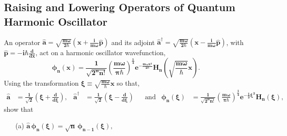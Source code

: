 \documentclass{article}
\begin{document}
{	\subsection*{Raising and Lowering Operators of Quantum Harmonic Oscillator}
	An operator $\bm{\hat{a} = \sqrt{\frac{m\omega}{2\hbar}} \left( x + \frac{i}{m\omega} \hat{p} \right)}$ and its adjoint $\bm{\hat{a}^{\dagger} = \sqrt{\frac{m\omega}{2\hbar}} \left( x - \frac{i}{m\omega} \hat{p} \right)}$, with $\bm{\hat{p} = -i\hbar \frac{d}{dx}}$, act on a harmonic oscillator wavefunction,
	\[
		\bm{\phi_n(x) = \frac{1}{\sqrt{2^n n!}}\left( \frac{m\omega}{\pi \hbar} \right)^{\frac{1}{4}} e^{-\frac{m\omega x^2}{2\hbar}} H_n\left(\sqrt{\frac{m\omega}{\hbar}}x\right) }.
	\]
	Using the transformation $\bm{\xi \equiv \sqrt{\frac{m\omega}{\hbar}}x }$ so that,
	\begin{equation*}
		\begin{aligned}
			\bm{\hat{a}} &\bm{= \frac{1}{\sqrt{2}} \left( \xi + \frac{d}{d\xi} \right),} & \bm{\hat{a}^\dagger} &\bm{= \frac{1}{\sqrt{2}} \left( \xi - \frac{d}{d\xi} \right)} & &\text{and} & \bm{\phi_n(\xi)} &\bm{= \frac{1}{\sqrt{2^n n!}}\left( \frac{m\omega}{\pi \hbar} \right)^{\frac{1}{4}} e^{-\frac{1}{2}\xi^2} H_n(\xi) ,}
		\end{aligned}
	\end{equation*}
	show that \\
	\begin{enumerate}
		\item[(a)] $\bm{ \hat{a} \, \phi_n(\xi) = \sqrt{n} \,\phi_{n-1}(\xi), }$
		

\end{enumerate}}
\end{document}
